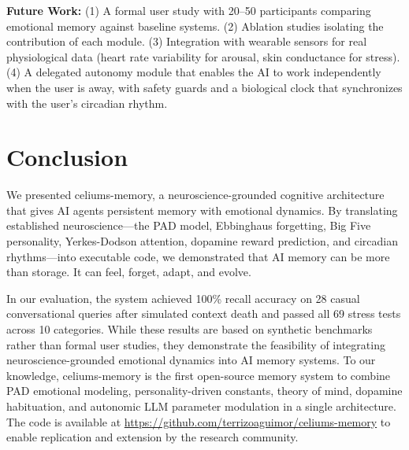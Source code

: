 \documentclass[journal,twoside]{IEEEtran}
\begin{document}
\textbf{Future Work:} (1) A formal user study with 20--50 participants comparing emotional memory against baseline systems. (2) Ablation studies isolating the contribution of each module. (3) Integration with wearable sensors for real physiological data (heart rate variability for arousal, skin conductance for stress). (4) A delegated autonomy module that enables the AI to work independently when the user is away, with safety guards and a biological clock that synchronizes with the user's circadian rhythm.

\section{Conclusion}

We presented celiums-memory, a neuroscience-grounded cognitive architecture that gives AI agents persistent memory with emotional dynamics. By translating established neuroscience—the PAD model, Ebbinghaus forgetting, Big Five personality, Yerkes-Dodson attention, dopamine reward prediction, and circadian rhythms—into executable code, we demonstrated that AI memory can be more than storage. It can feel, forget, adapt, and evolve.

In our evaluation, the system achieved 100\% recall accuracy on 28 casual conversational queries after simulated context death and passed all 69 stress tests across 10 categories. While these results are based on synthetic benchmarks rather than formal user studies, they demonstrate the feasibility of integrating neuroscience-grounded emotional dynamics into AI memory systems. To our knowledge, celiums-memory is the first open-source memory system to combine PAD emotional modeling, personality-driven constants, theory of mind, dopamine habituation, and autonomic LLM parameter modulation in a single architecture. The code is available at \url{https://github.com/terrizoaguimor/celiums-memory} to enable replication and extension by the research community.

\end{document}
